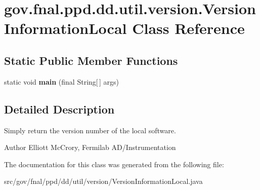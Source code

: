 \hypertarget{classgov_1_1fnal_1_1ppd_1_1dd_1_1util_1_1version_1_1VersionInformationLocal}{\section{gov.\-fnal.\-ppd.\-dd.\-util.\-version.\-Version\-Information\-Local Class Reference}
\label{classgov_1_1fnal_1_1ppd_1_1dd_1_1util_1_1version_1_1VersionInformationLocal}
}
\subsection*{Static Public Member Functions}
\begin{DoxyCompactItemize}
\item 
\hypertarget{classgov_1_1fnal_1_1ppd_1_1dd_1_1util_1_1version_1_1VersionInformationLocal_a3c31fae7dc534034a8752fbe94689ab3}{static void {\bfseries main} (final String\mbox{[}$\,$\mbox{]} args)}\label{classgov_1_1fnal_1_1ppd_1_1dd_1_1util_1_1version_1_1VersionInformationLocal_a3c31fae7dc534034a8752fbe94689ab3}

\end{DoxyCompactItemize}


\subsection{Detailed Description}
Simply return the version number of the local software.

\begin{DoxyAuthor}{Author}
Elliott Mc\-Crory, Fermilab A\-D/\-Instrumentation 
\end{DoxyAuthor}


The documentation for this class was generated from the following file\-:\begin{DoxyCompactItemize}
\item 
src/gov/fnal/ppd/dd/util/version/Version\-Information\-Local.\-java\end{DoxyCompactItemize}
